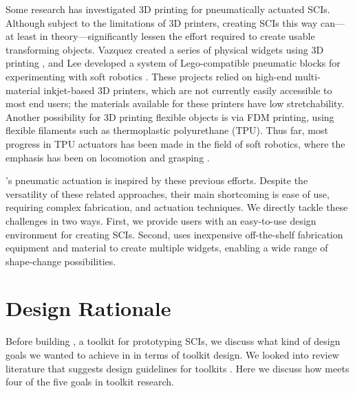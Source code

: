       Some research has investigated 3D printing for pneumatically actuated
      SCIs. Although subject to the limitations of 3D printers, creating SCIs
      this way can---at least in theory---significantly lessen the effort
      required to create usable transforming objects. Vazquez \etal created a
      series of physical widgets using 3D printing \cite{Vazquez:2015}, and
      Lee \etal developed a system of Lego-compatible pneumatic blocks for
      experimenting with soft robotics \cite{Lee:2018}. These projects relied on
      high-end multi-material inkjet-based 3D printers, which are not currently
      easily accessible to most end users; the materials available for these
      printers have low stretchability. Another possibility for 3D printing
      flexible objects is via FDM printing, using flexible filaments such as
      thermoplastic polyurethane (TPU). Thus far, most progress in TPU actuators
      has been made in the field of soft robotics, where the emphasis has been
      on locomotion and grasping \cite{Yap:2016}.
      
      \mp's pneumatic actuation is inspired by these previous efforts. Despite
      the versatility of these related approaches, their main shortcoming is
      ease of use, requiring complex fabrication, and actuation techniques. We
      directly tackle these challenges in two ways. First, we provide users with
      an easy-to-use design environment for creating SCIs. Second, \mp uses
      inexpensive off-the-shelf fabrication equipment and material to create
      multiple widgets, enabling a wide range of shape-change possibilities.

  \section{Design Rationale} 
    Before building \mp, a toolkit for prototyping SCIs, we discuss what
    kind of design goals we wanted to achieve in \mp in terms of toolkit design.
    We looked into review literature that suggests design guidelines for
    toolkits \cite{Ledo:2018a}. Here we discuss how \mp meets four of the five
    goals in toolkit research.
      
